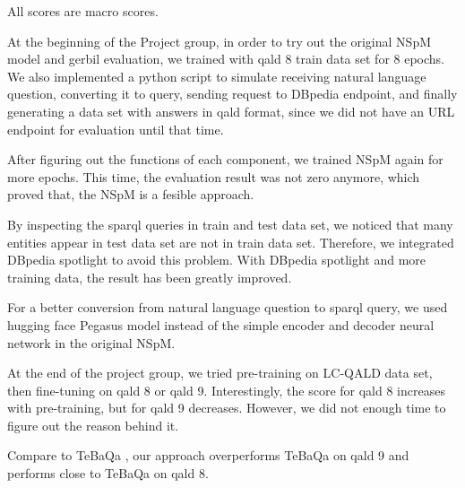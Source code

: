 All scores are macro scores. 

At the beginning of the Project group,
in order to try out the original NSpM model and gerbil evaluation,
we trained with qald 8 train data set for 8 epochs. 
We also implemented a python script to simulate 
receiving natural language question, 
converting it to query,
sending request to DBpedia endpoint, 
and finally generating a data set with answers in qald format,
since we did not have an URL endpoint for evaluation until that time. 

After figuring out the functions of each component, 
we trained NSpM again for more epochs. 
This time, the evaluation result was not zero anymore, 
which proved that,
the NSpM is a fesible approach. 

By inspecting the sparql queries in train and test data set, 
we noticed that
many entities appear in test data set are not in train data set. 
Therefore, we integrated DBpedia spotlight to avoid this problem. 
With DBpedia spotlight and more training data, 
the result has been greatly improved. 

For a better conversion from natural language question to sparql query, 
we used hugging face Pegasus model instead of the simple encoder and decoder neural network in the original NSpM.

At the end of the project group, we tried pre-training on LC-QALD data set, then fine-tuning on qald 8 or qald 9. 
Interestingly, the score for qald 8 increases with pre-training, 
but for qald 9 decreases. 
However, we did not enough time to figure out the reason behind it. 

Compare to TeBaQa \cite{DBLP:journals/corr/abs-2103-06752},
our approach overperforms TeBaQa on qald 9 and performs close to TeBaQa on qald 8.